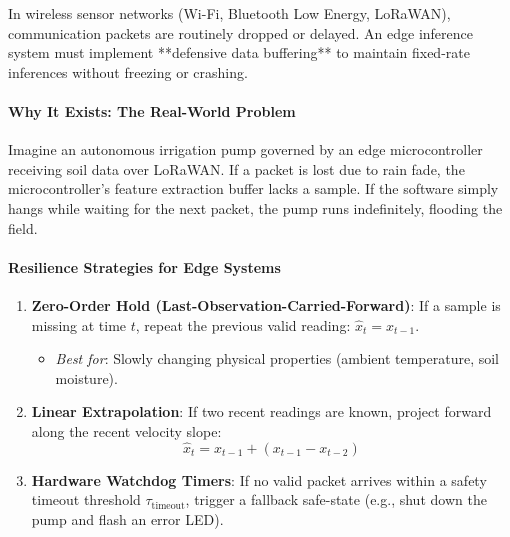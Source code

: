 \begin{keyidea}
In wireless sensor networks (Wi-Fi, Bluetooth Low Energy, LoRaWAN), communication packets are routinely dropped or delayed. An edge inference system must implement **defensive data buffering** to maintain fixed-rate inferences without freezing or crashing.
\end{keyidea}

\paragraph{Why It Exists: The Real-World Problem}
Imagine an autonomous irrigation pump governed by an edge microcontroller receiving soil data over LoRaWAN. If a packet is lost due to rain fade, the microcontroller's feature extraction buffer lacks a sample. If the software simply hangs while waiting for the next packet, the pump runs indefinitely, flooding the field.

\paragraph{Resilience Strategies for Edge Systems}
\begin{enumerate}
    \item \textbf{Zero-Order Hold (Last-Observation-Carried-Forward)}:
    If a sample is missing at time $t$, repeat the previous valid reading: $\hat{x}_t = x_{t-1}$.
    \begin{itemize}
        \item \textit{Best for}: Slowly changing physical properties (ambient temperature, soil moisture).
    \end{itemize}
    \item \textbf{Linear Extrapolation}:
    If two recent readings are known, project forward along the recent velocity slope:
    \begin{equation}
    \hat{x}_t = x_{t-1} + (x_{t-1} - x_{t-2})\label{eq:linear_extrap}
    \end{equation}
    \item \textbf{Hardware Watchdog Timers}:
    If no valid packet arrives within a safety timeout threshold $\tau_{\text{timeout}}$, trigger a fallback safe-state (e.g., shut down the pump and flash an error LED).
\end{enumerate}

